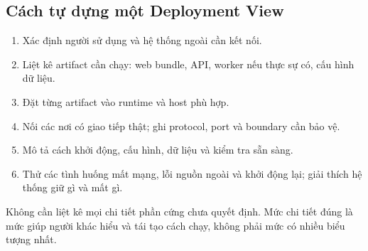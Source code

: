 \subsection{Cách tự dựng một Deployment View}
\begin{enumerate}
  \item Xác định người sử dụng và hệ thống ngoài cần kết nối.
  \item Liệt kê artifact cần chạy: web bundle, API, worker nếu thực sự có, cấu hình dữ liệu.
  \item Đặt từng artifact vào runtime và host phù hợp.
  \item Nối các nơi có giao tiếp thật; ghi protocol, port và boundary cần bảo vệ.
  \item Mô tả cách khởi động, cấu hình, dữ liệu và kiểm tra sẵn sàng.
  \item Thử các tình huống mất mạng, lỗi nguồn ngoài và khởi động lại; giải thích hệ thống giữ gì và mất gì.
\end{enumerate}
Không cần liệt kê mọi chi tiết phần cứng chưa quyết định. Mức chi tiết đúng là mức giúp người khác hiểu và tái tạo cách chạy, không phải mức có nhiều biểu tượng nhất.
